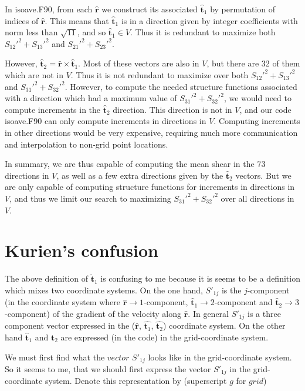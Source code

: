\documentclass[12pt]{article}
\begin{document}
In isoave.F90, from each $\bm{{\hat r}}$ we construct its associated
$\bm{{\hat t}}_1$ by permutation of indices of $\bm{{\hat r}}$.
This means that $\bm{{\hat t}}_1$ is in a direction given by integer coefficients
with norm less than $\sqrt{11}$, and so $\bm{{\hat t}}_1 \in V$.  
Thus it is redundant to maximize
both $S_{12}'^2 + S_{13}'^2$ and $S_{21}'^2 + S_{23}'^2$.

However, $\bm{{\hat t}}_2 = \bm{{\hat r}} \times \bm{{\hat t}}_1$.
Most of these vectors are also in $V$, but there are 32 of them 
which are not in $V$.  Thus it is not redundant to maximize over
both $S_{12}'^2 + S_{13}'^2$ and $S_{31}'^2 + S_{32}'^2$.
However, to compute the needed structure functions associated with
a direction which had a maximum value of $S_{31}'^2 + S_{32}'^2$, we
would need to compute increments in the $\bm{{\hat t}}_2$ direction.
This direction is not in $V$, and our code isoave.F90 can only 
compute increments in directions in $V$.  Computing increments in
other directions would be very expensive, requiring much more communication
and interpolation to non-grid point locations.

In summary, we are thus capable of computing the mean shear in
the 73 directions in $V$, as well as a few extra directions given by the
$\bm{{\hat t}}_2$ vectors.   But we are only capable of computing
structure functions for increments in directions in $V$, and thus
we limit our search to maximizing $S_{31}'^2 + S_{32}'^2$ over
all directions in $V$.  


\section*{Kurien's confusion}

The above definition of $\bm{{\tilde t}}_1$ is confusing to me because
it is seems to be a definition which mixes two coordinate systems. On
the one hand, $S'_{1j}$ is the $j$-component (in the coordinate system
where $\hat{\bm{ r}} \rightarrow 1$-component, $\hat{\bm{t}}_1
\rightarrow 2$-component and $\hat{\bm{ t}}_2 \rightarrow
3$-component) of the gradient of the velocity along $\hat{\bm{
r}}$. In general $S'_{1j}$ is a three component vector expressed in
the ($\hat{\bm{ r}}$, $\hat{\bm{t}_1}$, $\hat{\bm{t}_2}$) coordinate
system. On the other hand $\hat{\bm{t}}_1$ and $\hat{\bm{t}}_2$ are
expressed (in the code) in the grid-coordinate system.

We must first find what the $vector$ $S'_{1j}$ looks like in the
grid-coordinate system. So it seems to me, that we should first
express the vector $S'_{1j}$ in the grid-coordinate system. Denote
this representation by (superscript $g$ for $grid$)
\end{document}
